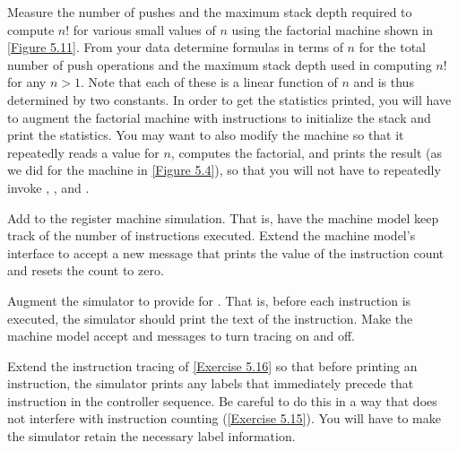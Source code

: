 \begin{exercise}
	\label{Exercise 5.14}
	Measure the number of pushes and the maximum stack depth required to compute \( n!
	\) for various small values of \( n \) using the factorial machine shown in \cref{Figure 5.11}.
	From your data determine formulas in terms of \( n \) for the total number of push operations and the maximum stack depth used in computing \( n!
	\) for any \( n > 1 \).
	Note that each of these is a linear function of \( n \) and is thus determined by two constants.
	In order to get the statistics printed, you will have to augment the factorial machine with instructions to initialize the stack and print the statistics.
	You may want to also modify the machine so that it repeatedly reads a value for \( n \), computes the factorial, and prints the result (as we did for the  machine in \cref{Figure 5.4}), so that you will not have to repeatedly invoke , , and .
\end{exercise}



\begin{exercise}
	\label{Exercise 5.15}
	Add  to the register machine simulation.
	That is, have the machine model keep track of the number of instructions executed.
	Extend the machine model’s interface to accept a new message that prints the value of the instruction count and resets the count to zero.
\end{exercise}



\begin{exercise}
	\label{Exercise 5.16}
	Augment the simulator to provide for .
	That is, before each instruction is executed, the simulator should print the text of the instruction.
	Make the machine model accept  and  messages to turn tracing on and off.
\end{exercise}



\begin{exercise}
	\label{Exercise 5.17}
	Extend the instruction tracing of \cref{Exercise 5.16} so that before printing an instruction, the simulator prints any labels that immediately precede that instruction in the controller sequence.
	Be careful to do this in a way that does not interfere with instruction counting (\cref{Exercise 5.15}).
	You will have to make the simulator retain the necessary label information.
\end{exercise}




